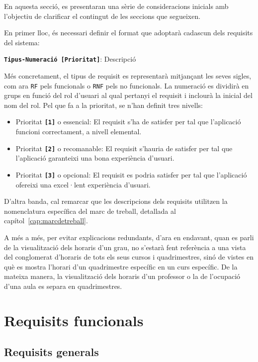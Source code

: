 \documentclass[a4paper,12pt]{ThesisStyle}
\begin{document}
En aquesta secció, es presentaran una sèrie de consideracions inicials amb l'objectiu de clarificar el contingut de les seccions que segueixen.

En primer lloc, és necessari definir el format que adoptarà cadascun dels requisits del sistema:
\\[8pt]
\centerline{\texttt{\textbf{Tipus-Numeració [Prioritat]}}: Descripció}

Més concretament, el tipus de requisit es representarà mitjançant les seves sigles, com ara \texttt{RF} pels funcionals o \texttt{RNF} pels no funcionals. La numeració es dividirà en grups en funció del rol d'usuari al qual pertanyi el requisit i inclourà la inicial del nom del rol. Pel que fa a la prioritat, se n'han definit tres nivells:
\begin{itemize}
  \item Prioritat \texttt{\textbf{[1]}} o essencial: El requisit s'ha de satisfer per tal que l'aplicació funcioni correctament, a nivell elemental.
  \item Prioritat \texttt{\textbf{[2]}} o recomanable: El requisit s'hauria de satisfer per tal que l'aplicació garanteixi una bona experiència d'usuari.
  \item Prioritat \texttt{\textbf{[3]}} o opcional: El requisit es podria satisfer per tal que l'aplicació ofereixi una excel·lent experiència d'usuari.
\end{itemize}

D'altra banda, cal remarcar que les descripcions dels requisits utilitzen la nomenclatura específica del marc de treball, detallada al capítol~\ref{cap:marcdetreball}.

A més a més, per evitar explicacions redundants, d'ara en endavant, quan es parli de la visualització dels horaris d'un grau, no s'estarà fent referència a una vista del conglomerat d'horaris de tots els seus cursos i quadrimestres, sinó de vistes en què es mostra l'horari d'un quadrimestre específic en un curs específic. De la mateixa manera, la visualització dels horaris d'un professor o la de l'ocupació d'una aula es separa en quadrimestres.

\section{Requisits funcionals}
\label{sec:requisits_funcionals}

\subsection{Requisits generals}
\label{subsec:requisits_generals}
\end{document}
